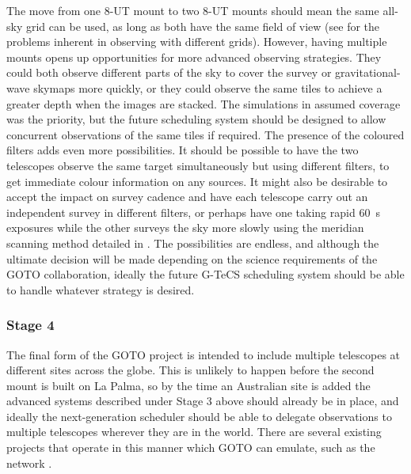 \begin{colsection}
The move from one 8-UT mount to two 8-UT mounts should mean the same all-sky grid can be used, as long as both have the same field of view (see  for the problems inherent in observing with different grids). However, having multiple mounts opens up opportunities for more advanced observing strategies. They could both observe different parts of the sky to cover the survey or gravitational-wave skymaps more quickly, or they could observe the same tiles to achieve a greater depth when the images are stacked. The simulations in  assumed coverage was the priority, but the future scheduling system should be designed to allow concurrent observations of the same tiles if required. The presence of the coloured filters adds even more possibilities. It should be possible to have the two telescopes observe the same target simultaneously but using different filters, to get immediate colour information on any sources. It might also be desirable to accept the impact on survey cadence and have each telescope carry out an independent survey in different filters, or perhaps have one taking rapid \SI{60}{\second} exposures while the other surveys the sky more slowly using the meridian scanning method detailed in . The possibilities are endless, and although the ultimate decision will be made depending on the science requirements of the GOTO collaboration, ideally the future G-TeCS scheduling system should be able to handle whatever strategy is desired.

\subsubsection{Stage 4}

The final form of the GOTO project is intended to include multiple telescopes at different sites across the globe. This is unlikely to happen before the second mount is built on La Palma, so by the time an Australian site is added the advanced systems described under Stage 3 above should already be in place, and ideally the next-generation scheduler should be able to delegate observations to multiple telescopes wherever they are in the world. There are several existing projects that operate in this manner which GOTO can emulate, such as the  network \citep{LCO_scheduling}.

\newpage

\end{colsection}


